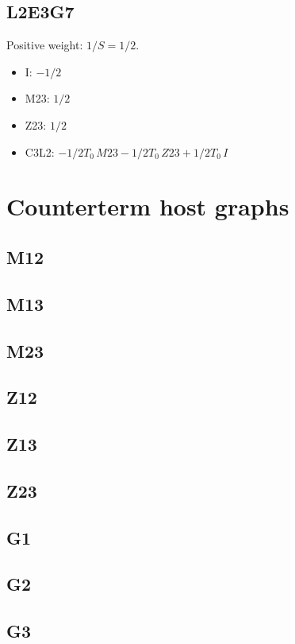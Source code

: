 \documentclass{article}
\begin{document}
\subsection*{L2E3G7}

Positive weight: $1/S=1/2$.
\begin{itemize}
\item I: $- 1/2$
\item M23: $1/2$
\item Z23: $1/2$
\item C3L2: $- 1/2 T_0\,M23 - 1/2 T_0\,Z23 + 1/2 T_0\,I$
\end{itemize}
\section*{Counterterm host graphs}
\subsection*{M12}

\subsection*{M13}

\subsection*{M23}

\subsection*{Z12}

\subsection*{Z13}

\subsection*{Z23}

\subsection*{G1}

\subsection*{G2}

\subsection*{G3}

\end{document}
